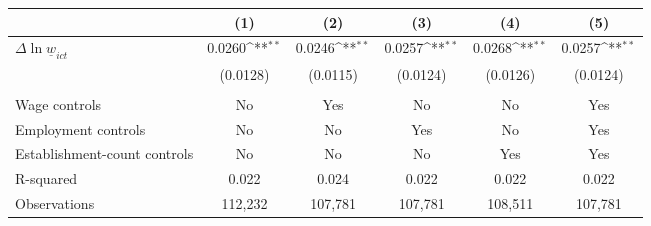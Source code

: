 {
\def\sym#1{\ifmmode^{#1}\else\(^{#1}\)\fi}
\begin{tabular}{l*{5}{c}}
\hline\hline
          &\multicolumn{1}{c}{(1)}         &\multicolumn{1}{c}{(2)}         &\multicolumn{1}{c}{(3)}         &\multicolumn{1}{c}{(4)}         &\multicolumn{1}{c}{(5)}         \\
\hline
$\Delta \ln \underline{w}_{ict}$&   0.0260\sym{**} &   0.0246\sym{**} &   0.0257\sym{**} &   0.0268\sym{**} &   0.0257\sym{**} \\
          & (0.0128)         & (0.0115)         & (0.0124)         & (0.0126)         & (0.0124)         \\
\hline
\vspace{-2mm}&                  &                  &                  &                  &                  \\
Wage controls&       No         &      Yes         &       No         &       No         &      Yes         \\
Employment controls&       No         &       No         &      Yes         &       No         &      Yes         \\
Establishment-count controls&       No         &       No         &       No         &      Yes         &      Yes         \\
R-squared &    0.022         &    0.024         &    0.022         &    0.022         &    0.022         \\
Observations&  112,232         &  107,781         &  107,781         &  108,511         &  107,781         \\
\hline\hline
\end{tabular}
}
